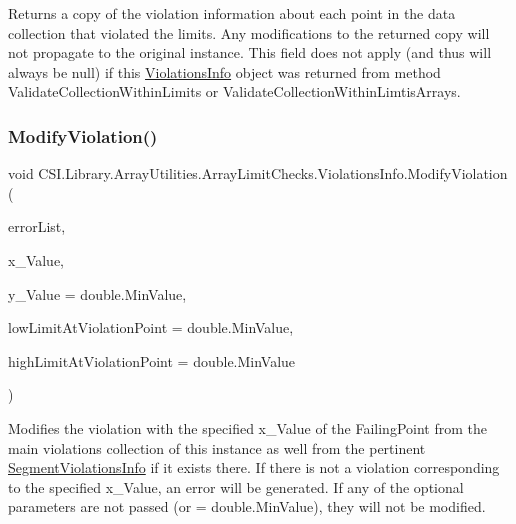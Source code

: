 Returns a copy of the violation information about each point in the data collection that violated the limits. Any modifications to the returned copy will not propagate to the original instance. This field does not apply (and thus will always be null) if this \mbox{\hyperlink{struct_c_s_i_1_1_library_1_1_array_utilities_1_1_array_limit_checks_1_1_violations_info}{Violations\+Info}} object was returned from method Validate\+Collection\+Within\+Limits or Validate\+Collection\+Within\+Limtis\+Arrays. 

\mbox{\label{struct_c_s_i_1_1_library_1_1_array_utilities_1_1_array_limit_checks_1_1_violations_info_ac8810869d724d19a43cb5cfa9f318e96}} 
\subsubsection{\texorpdfstring{ModifyViolation()}{ModifyViolation()}}
{\footnotesize\ttfamily void C\+S\+I.\+Library.\+Array\+Utilities.\+Array\+Limit\+Checks.\+Violations\+Info.\+Modify\+Violation (\begin{DoxyParamCaption}\item[{\mbox{\hyperlink{class_c_s_i_1_1_library_1_1_errors_1_1_error_list}{Error\+List}}}]{error\+List,  }\item[{double}]{x\+\_\+\+Value,  }\item[{double}]{y\+\_\+\+Value = {\ttfamily double.MinValue},  }\item[{double}]{low\+Limit\+At\+Violation\+Point = {\ttfamily double.MinValue},  }\item[{double}]{high\+Limit\+At\+Violation\+Point = {\ttfamily double.MinValue} }\end{DoxyParamCaption})\hspace{0.3cm}{\ttfamily [inline]}}



Modifies the violation with the specified x\+\_\+\+Value of the Failing\+Point from the main violations collection of this instance as well from the pertinent \mbox{\hyperlink{class_c_s_i_1_1_library_1_1_array_utilities_1_1_array_limit_checks_1_1_segment_violations_info}{Segment\+Violations\+Info}} if it exists there. If there is not a violation corresponding to the specified x\+\_\+\+Value, an error will be generated. If any of the optional parameters are not passed (or = double.\+Min\+Value), they will not be modified. 


